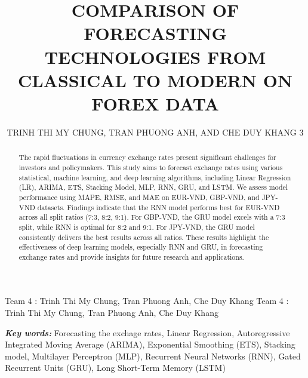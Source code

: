 \documentclass{ieeeojies}
\begin{document}
\title{COMPARISON OF FORECASTING TECHNOLOGIES FROM CLASSICAL TO MODERN ON FOREX DATA}

\author{\uppercase{Trinh Thi My Chung},
\uppercase{Tran Phuong Anh, and Che Duy Khang 3}}

\address[1]{Faculty of Information Systems, University of Information Technology, (e-mail: 21520653@gm.uit.edu.vn)}
\address[2]{Faculty of Information Systems, University of Information Technology, (e-mail: 21520595@gm.uit.edu.vn)}
\address[3]{Faculty of Information Systems, University of Information Technology, (e-mail: 21522187@gm.uit.edu.vn)}

\markboth
{Team 4 \headeretal: Trinh Thi My Chung, Tran Phuong Anh, Che Duy Khang}
{Team 4 \headeretal: Trinh Thi My Chung, Tran Phuong Anh, Che Duy Khang}

\begin{abstract}

The rapid fluctuations in currency exchange rates present significant challenges for investors and policymakers. This study aims to forecast exchange rates using various statistical, machine learning, and deep learning algorithms, including Linear Regression (LR), ARIMA, ETS, Stacking Model, MLP, RNN, GRU, and LSTM. We assess model performance using MAPE, RMSE, and MAE on EUR-VND, GBP-VND, and JPY-VND datasets. Findings indicate that the RNN model performs best for EUR-VND across all split ratios (7:3, 8:2, 9:1). For GBP-VND, the GRU model excels with a 7:3 split, while RNN is optimal for 8:2 and 9:1. For JPY-VND, the GRU model consistently delivers the best results across all ratios. These results highlight the effectiveness of deep learning models, especially RNN and GRU, in forecasting exchange rates and provide insights for future research and applications.
\end{abstract}

\begin{keywords}

\textit{\textbf{Key words:}} Forecasting the exchage rates, Linear Regression, Autoregressive Integrated Moving Average (ARIMA), Exponential Smoothing (ETS), Stacking model, Multilayer Perceptron (MLP), Recurrent Neural Networks (RNN), Gated Recurrent Units (GRU), Long Short-Term Memory (LSTM)
\end{keywords}

\titlepgskip=-15pt

\maketitle
\end{document}
